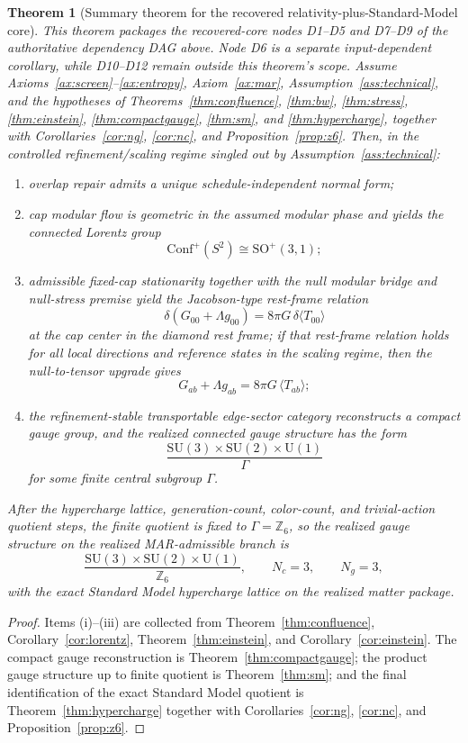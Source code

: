 \documentclass[11pt]{article}
\newtheorem{theorem}{Theorem}[section]
\newcommand{\SU}{\mathrm{SU}}
\newcommand{\U}{\mathrm{U}}
\newcommand{\Conf}{\mathrm{Conf}}
\begin{document}
\begin{theorem}[Summary theorem for the recovered relativity-plus-Standard-Model core]\label{thm:master}
This theorem packages the recovered-core nodes D1--D5 and D7--D9 of the authoritative dependency DAG above. Node D6 is a separate input-dependent corollary, while D10--D12 remain outside this theorem's scope. Assume Axioms~\ref{ax:screen}--\ref{ax:entropy}, Axiom~\ref{ax:mar}, Assumption~\ref{ass:technical}, and the hypotheses of Theorems~\ref{thm:confluence}, \ref{thm:bw}, \ref{thm:stress}, \ref{thm:einstein}, \ref{thm:compactgauge}, \ref{thm:sm}, and \ref{thm:hypercharge}, together with Corollaries~\ref{cor:ng}, \ref{cor:nc}, and Proposition~\ref{prop:z6}. Then, in the controlled refinement/scaling regime singled out by Assumption~\ref{ass:technical}:
\begin{enumerate}[label=(\roman*),leftmargin=2em]
\item overlap repair admits a unique schedule-independent normal form;
\item cap modular flow is geometric in the assumed modular phase and yields the connected Lorentz group
\[
\Conf^+(S^2)\cong \mathrm{SO}^+(3,1);
\]
\item admissible fixed-cap stationarity together with the null modular bridge and null-stress premise yield the Jacobson-type rest-frame relation
\[
\delta\!\left(G_{00}+\Lambda g_{00}\right)=8\pi G\,\delta\langle T_{00}\rangle
\]
at the cap center in the diamond rest frame; if that rest-frame relation holds for all local directions and reference states in the scaling regime, then the null-to-tensor upgrade gives
\[
G_{ab}+\Lambda g_{ab}=8\pi G\,\langle T_{ab}\rangle;
\]
\item the refinement-stable transportable edge-sector category reconstructs a compact gauge group, and the realized connected gauge structure has the form
\[
\frac{\SU(3)\times\SU(2)\times\U(1)}{\Gamma}
\]
for some finite central subgroup \(\Gamma\).
\end{enumerate}
After the hypercharge lattice, generation-count, color-count, and trivial-action quotient steps, the finite quotient is fixed to \(\Gamma=\mathbb Z_6\), so the realized gauge structure on the realized MAR-admissible branch is
\[
\frac{\SU(3)\times\SU(2)\times\U(1)}{\mathbb Z_6},
\qquad
N_c=3,
\qquad
N_g=3,
\]
with the exact Standard Model hypercharge lattice on the realized matter package.
\end{theorem}

\begin{proof}
Items (i)--(iii) are collected from Theorem~\ref{thm:confluence}, Corollary~\ref{cor:lorentz}, Theorem~\ref{thm:einstein}, and Corollary~\ref{cor:einstein}. The compact gauge reconstruction is Theorem~\ref{thm:compactgauge}; the product gauge structure up to finite quotient is Theorem~\ref{thm:sm}; and the final identification of the exact Standard Model quotient is Theorem~\ref{thm:hypercharge} together with Corollaries~\ref{cor:ng}, \ref{cor:nc}, and Proposition~\ref{prop:z6}.
\end{proof}
\end{document}
